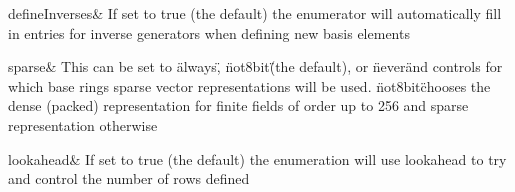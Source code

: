 defineInverses& If set to true (the default) the enumerator will
automatically fill in entries for inverse generators when defining new
basis elements

sparse& This can be set to \"always\", \"not8bit\" (the default), or
\"never\" and controls for which base rings sparse vector representations
will be used. \"not8bit\" chooses the dense (packed) representation for
finite fields of order up to 256 and sparse representation otherwise

lookahead& If set to true (the default) the enumeration will use
lookahead to try and control the number of rows defined
\enditems



